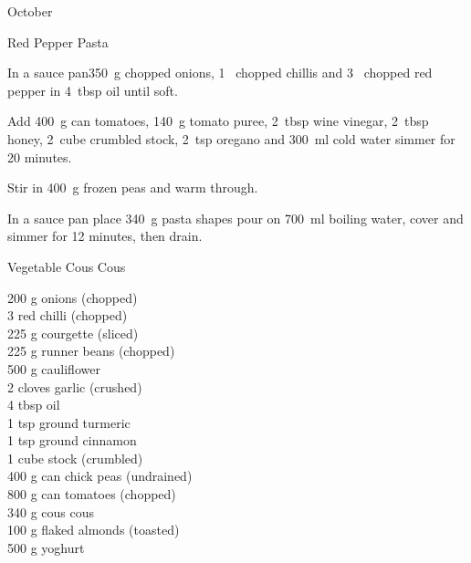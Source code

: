\begin{menu}{October}
\begin{recipe}{2}{Red Pepper Pasta}
    \begin{instructions}
    \item 
        In a sauce pan350~g chopped onions,
        1~ chopped chillis
        and
        3~ chopped red pepper
        in
        4~tbsp  oil
        until soft.
      \item 
        Add
        400~g  can tomatoes,
        140~g  tomato puree,
        2~tbsp  wine vinegar,
        2~tbsp  honey,
        2~cube crumbled stock,
        2~tsp  oregano
        and
        300~ml  cold water
        simmer for 20 minutes.
      \item 
        Stir in
        400~g  frozen peas
        and warm through.
      \item 
    In a
    sauce pan
    place
    340~g  pasta shapes
    pour on
    700~ml  boiling water,
    cover and simmer for 12 minutes, then drain.
  
    \end{instructions}
    \end{recipe}%
  
    \begin{recipe}{2}{Vegetable Cous Cous}%
		\begin{ingredients}
		200 g onions (chopped) \\
	3  red chilli (chopped) \\
	225 g courgette (sliced) \\
	225 g runner beans (chopped) \\
	500 g cauliflower  \\
	2 cloves garlic (crushed) \\
	4 tbsp oil  \\
	1 tsp ground turmeric  \\
	1 tsp ground cinnamon  \\
	1 cube stock (crumbled) \\
	400 g can chick peas (undrained) \\
	800 g can tomatoes (chopped) \\
	340 g cous cous  \\
	100 g flaked almonds (toasted) \\
	500 g yoghurt  \\
	
		\end{ingredients}
	
	

\end{recipe}
\end{menu}
